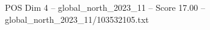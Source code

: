 \begin{textsample}{POS Dim 4 – global\_north\_2023\_11 – Score 17.00 – global\_north\_2023\_11/103532105.txt}
\end{textsample}
